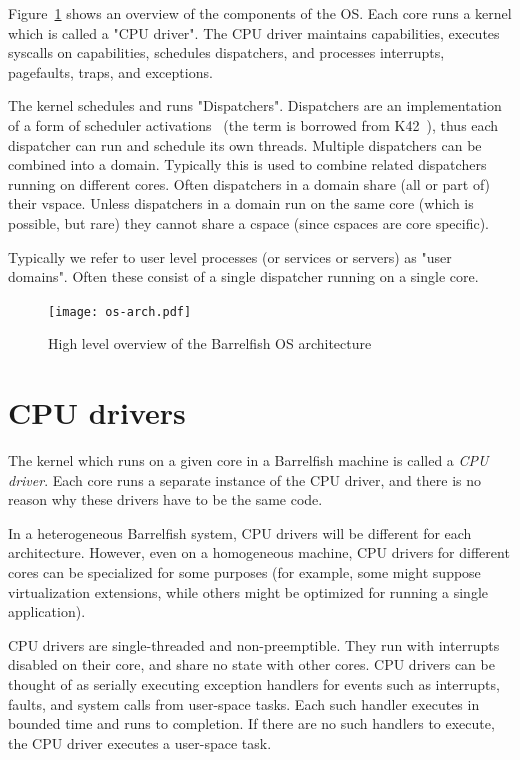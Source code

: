 \documentclass[a4paper,twoside]{report} %
\begin{document}
Figure~\ref{fig:os-arch} shows an overview of the components of the OS.  Each
core runs a kernel which is called a "CPU driver". The CPU driver maintains
capabilities, executes syscalls on capabilities, schedules dispatchers, and
processes interrupts, pagefaults, traps, and exceptions.

The kernel schedules and runs "Dispatchers". Dispatchers are an
implementation of a form of scheduler
activations~\cite{Anderson:1991:SAE:121132.121151} (the term is
borrowed from K42~\cite{k42:scheduling}), thus each dispatcher can run
and schedule its own threads.  Multiple dispatchers can be combined
into a domain. Typically this is used to combine related dispatchers
running on different cores. Often dispatchers in a domain share (all
or part of) their vspace. Unless dispatchers in a domain run on the
same core (which is possible, but rare) they cannot share a cspace
(since cspaces are core specific).

Typically we refer to user level processes (or services or servers) as "user
domains". Often these consist of a single dispatcher running on a single core.

\begin{figure}[hbt]
 \begin{center}
 \texttt{[image: os-arch.pdf]}
 \end{center}
 \caption{High level overview of the Barrelfish OS architecture}\label{fig:os-arch}
\end{figure}

\section{CPU drivers}

The kernel which runs on a given core in a Barrelfish machine is
called a \emph{CPU driver}.  Each core runs a separate instance of the
CPU driver, and there is no reason why these drivers have to be the
same code.  

In a heterogeneous Barrelfish system, CPU drivers will be different
for each architecture.  However, even on a homogeneous machine, CPU
drivers for different cores can be specialized for some purposes (for
example, some might suppose virtualization extensions, while others
might be optimized for running a single application).  

CPU drivers are single-threaded and non-preemptible.
They run with interrupts disabled on their core, and share no state
with other cores.  CPU drivers can be thought of as serially executing
exception handlers for events such as interrupts, faults, and system
calls from user-space tasks.  Each such handler executes in bounded time
and runs to completion.  If there are no such handlers to execute, the
CPU driver executes a user-space task. 
\end{document}
